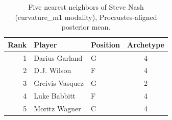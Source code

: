 \begin{table}[htbp]
  \centering\small
  \begin{tabular}{rllc}
    \toprule
    Rank & Player & Position & Archetype \\
    \midrule
    1 & Darius Garland & G & 4 \\
    2 & D.J. Wilson & F & 4 \\
    3 & Greivis Vasquez & G & 2 \\
    4 & Luke Babbitt & F & 4 \\
    5 & Moritz Wagner & C & 4 \\
    \bottomrule
  \end{tabular}
  \caption{Five nearest neighbors of Steve Nash (curvature_m1 modality), Procrustes-aligned posterior mean.}
  \label{tab:Steve_Nash_neighbors_curvature_m1}
\end{table}

